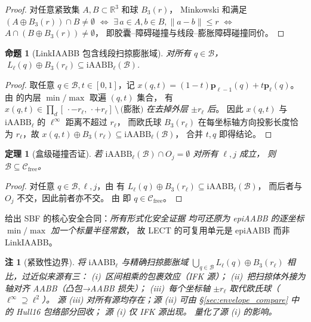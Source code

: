 \documentclass[journal]{IEEEtran}
\newtheorem{theorem}{定理}
\newtheorem{proposition}{命题}
\newtheorem{remark}{注}
\newcommand{\iAABB}{\mathrm{iAABB}}
\newcommand{\Real}{\mathbb{R}}
\newcommand{\Cfree}{\mathcal{C}_{\mathrm{free}}}
\begin{document}
\begin{proof}
对任意紧致集 $A,B\subset\Real^3$ 和球 $B_3(r)$，
Minkowski 和满足
$(A\oplus B_3(r))\cap B \neq\emptyset$
$\Leftrightarrow$ $\exists\,a\in A,b\in B,\|a-b\|\leq r$
$\Leftrightarrow$ $A\cap(B\oplus B_3(r))\neq\emptyset$，
即胶囊--障碍碰撞与线段--膨胀障碍碰撞同价。
\end{proof}

\begin{proposition}[LinkIAABB 包含线段扫掠膨胀域]
\label{prop:iaabb_contains}
对所有 $q\in\mathcal{B}$，
$\;L_\ell(q)\oplus B_3(r_\ell)\subseteq\iAABB_\ell(\mathcal{B})$.
\end{proposition}

\begin{proof}
取任意 $q\in\mathcal{B},t\in[0,1]$，记
$x(q,t)=(1-t)\bm{p}_{\ell-1}(q)+t\bm{p}_\ell(q)$。
由  的内层 $\min/\max$ 取遍 $(q,t)$ 集合，
有 $x(q,t)\in\prod_d[\,\cdot-r_\ell,\,\cdot+r_\ell]\,\setminus\,\text{(膨胀)}$
\emph{在去掉外层 $\pm r_\ell$ 后}。
因此 $x(q,t)$ 与 $\iAABB_\ell$ 的 $\ell^\infty$ 距离不超过 $r_\ell$，
而欧氏球 $B_3(r_\ell)$ 在每坐标轴方向投影长度恰为 $r_\ell$，故
$x(q,t)\oplus B_3(r_\ell)\subseteq\iAABB_\ell(\mathcal{B})$，
合并 $t,q$ 即得结论。
\end{proof}

\begin{theorem}[盒级碰撞否证]\label{thm:certify}
若 $\iAABB_\ell(\mathcal{B})\cap O_j=\emptyset$ 对所有 $\ell,j$ 成立，
则 $\mathcal{B}\subseteq\Cfree$。
\end{theorem}

\begin{proof}
对任意 $q\in\mathcal{B},\ell,j$，由 
有 $L_\ell(q)\oplus B_3(r_\ell)\subseteq\iAABB_\ell(\mathcal{B})$，
而后者与 $O_j$ 不交，因此前者亦不交。
由  即 $q\in\Cfree$。
\end{proof}

 给出 SBF 的核心安全合同：\emph{所有形式化安全证据
均可还原为 epiAABB 的逐坐标 $\min/\max$ 加一个标量半径常数}，
故 LECT 的可复用单元是 epiAABB 而非 LinkIAABB。

\begin{remark}[紧致性边界]\label{rem:tightness}
将 $\iAABB_\ell$ 与精确扫掠膨胀域 $\bigcup_{q\in\mathcal{B}}
L_\ell(q)\oplus B_3(r_\ell)$ 相比，过近似来源有三：
(i)~区间相乘的\emph{包裹效应}（IFK 源）；
(ii)~把扫掠体外接为轴对齐 AABB（凸包→AABB 损失）；
(iii)~每个坐标轴 $\pm r_\ell$ 取代欧氏球（$\ell^\infty\!\supseteq\!\ell^2$）。
源 (iii) 对所有源均存在；源 (ii) 可由 §\ref{sec:envelope_compare} 中的 Hull16 包络部分回收；
源 (i) 仅 IFK 源出现。 量化了源 (i) 的影响。
\end{remark}
\end{document}
